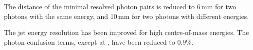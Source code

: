 The distance of the minimal resolved photon pairs is reduced to 6\,mm for two photons with the same energy, and 10\,mm for two photons with different energies.

The jet energy resolution has been improved for high centre-of-mass energies. The photon confusion terms, except at , have been reduced to 0.9\%.


